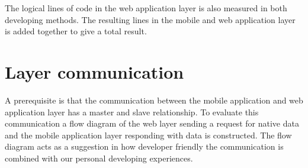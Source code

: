 The logical lines of code in the web application layer is also measured in both developing methods. The resulting lines in the mobile and web application layer is added together to give a total result. 

\section{Layer communication} \label{section-layer-communication}
A prerequisite is that the communication between the mobile application and web application layer has a master and slave relationship. To evaluate this communication a flow diagram of the web layer sending a request for native data and the mobile application layer responding with data is constructed. The flow diagram acts as a suggestion in how developer friendly the communication is combined with our personal developing experiences.